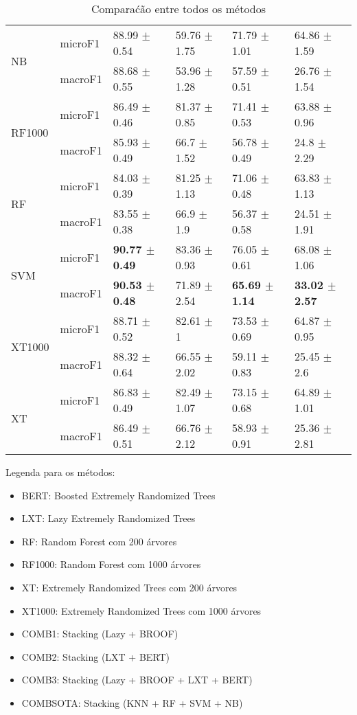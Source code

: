 \documentclass[]{article}
\begin{document}
\begin{table}[ht]
\begin{tabular}{llllll}
  \multirow{2}{*}{NB} & microF1 & 88.99 $\pm$  0.54 & 59.76 $\pm$  1.75 & 71.79 $\pm$  1.01 & 64.86 $\pm$  1.59 \\ 
   & macroF1 & 88.68 $\pm$  0.55 & 53.96 $\pm$  1.28 & 57.59 $\pm$  0.51 & 26.76 $\pm$  1.54 \\ 
  \multirow{2}{*}{RF1000} & microF1 & 86.49 $\pm$  0.46 & 81.37 $\pm$  0.85 & 71.41 $\pm$  0.53 & 63.88 $\pm$  0.96 \\ 
   & macroF1 & 85.93 $\pm$  0.49 & 66.7 $\pm$  1.52 & 56.78 $\pm$  0.49 & 24.8 $\pm$  2.29 \\ 
  \multirow{2}{*}{RF} & microF1 & 84.03 $\pm$  0.39 & 81.25 $\pm$  1.13 & 71.06 $\pm$  0.48 & 63.83 $\pm$  1.13 \\ 
   & macroF1 & 83.55 $\pm$  0.38 & 66.9 $\pm$  1.9 & 56.37 $\pm$  0.58 & 24.51 $\pm$  1.91 \\ 
  \multirow{2}{*}{SVM} & microF1 & \bf{90.77 $\pm$  0.49} & 83.36 $\pm$  0.93 & 76.05 $\pm$  0.61 & 68.08 $\pm$  1.06 \\ 
   & macroF1 & \bf{90.53 $\pm$  0.48} & 71.89 $\pm$  2.54 & \bf{65.69 $\pm$  1.14} & \bf{33.02 $\pm$  2.57} \\ 
  \multirow{2}{*}{XT1000} & microF1 & 88.71 $\pm$  0.52 & 82.61 $\pm$  1 & 73.53 $\pm$  0.69 & 64.87 $\pm$  0.95 \\ 
   & macroF1 & 88.32 $\pm$  0.64 & 66.55 $\pm$  2.02 & 59.11 $\pm$  0.83 & 25.45 $\pm$  2.6 \\ 
  \multirow{2}{*}{XT} & microF1 & 86.83 $\pm$  0.49 & 82.49 $\pm$  1.07 & 73.15 $\pm$  0.68 & 64.89 $\pm$  1.01 \\ 
   & macroF1 & 86.49 $\pm$  0.51 & 66.76 $\pm$  2.12 & 58.93 $\pm$  0.91 & 25.36 $\pm$  2.81 \\ 
   \hline
\end{tabular}
\caption{Comparaćão entre todos os métodos} 
\end{table}

Legenda para os métodos:

\begin{itemize}
\itemsep1pt\parskip0pt
\item
  BERT: Boosted Extremely Randomized Trees
\item
  LXT: Lazy Extremely Randomized Trees
\item
  RF: Random Forest com 200 árvores
\item
  RF1000: Random Forest com 1000 árvores
\item
  XT: Extremely Randomized Trees com 200 árvores
\item
  XT1000: Extremely Randomized Trees com 1000 árvores
\item
  COMB1: Stacking (Lazy + BROOF)
\item
  COMB2: Stacking (LXT + BERT)
\item
  COMB3: Stacking (Lazy + BROOF + LXT + BERT)
\item
  COMBSOTA: Stacking (KNN + RF + SVM + NB)
\end{itemize}
\end{document}
